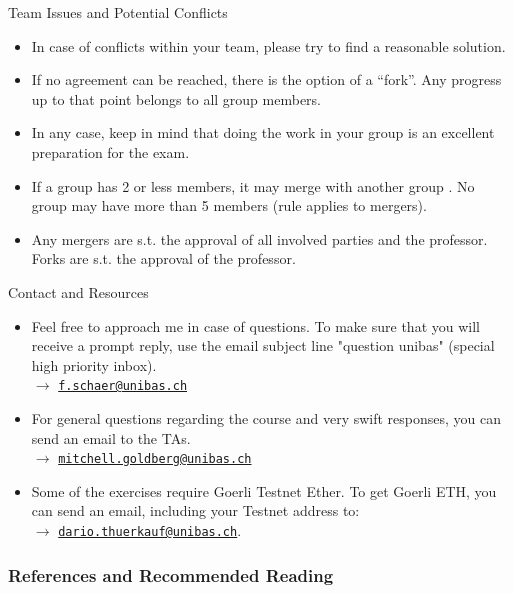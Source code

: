 \documentclass[handout]{beamer}
\begin{document}
\begin{frame}{Team Issues and Potential Conflicts}
\begin{itemize}
	\item<1-> In case of conflicts within your team, please try to find a \color{focus} reasonable solution\color{black}. 
	\item<2-> If no agreement can be reached, there is \color{focus} the option of a ``fork''\color{black}. Any progress up to that point belongs to all group members. 
	\item<3-> In any case, keep in mind that doing the work in your group is an \color{focus} excellent preparation for the exam\color{black}. 
	\item<4-> If a group \color{focus} has 2 or less members, it may merge with another group \color{black}. No group may have more than 5 members (rule applies to mergers). 
	\item<5-> Any mergers are \color{focus} s.t. the approval \color{black} of all involved parties and the professor. Forks are s.t. the approval of the professor.
\end{itemize}
\end{frame}


\begin{frame}{Contact and Resources}
\begin{itemize}
	\item<1-> Feel free to approach me in case of questions. To make sure that you will receive a prompt reply, use the email subject line "question unibas" (special high priority inbox). \\ $\rightarrow$ \href{mailto:f.schaer@unibas.ch?subject=question\%20unibas}{\texttt{f.schaer@unibas.ch}}
	\item<2-> For general questions regarding the course and very swift responses, you can send an email to the TAs. \\$\rightarrow$ \href{mailto:mitchell.goldberg@unibas.ch?subject=question\%20unibas}{\texttt{mitchell.goldberg@unibas.ch}}
	\item<3-> Some of the exercises require Goerli Testnet Ether. To get Goerli ETH, you can send an email, including your Testnet address to: \\
	$\rightarrow$ \href{mailto:dario.thuerkauf@unibas.ch?subject=Goerli\%20ETH}{\texttt{dario.thuerkauf@unibas.ch}}.
\end{itemize}
\end{frame}


\begin{frame}%
\frametitle{References and Recommended Reading}
	
	
\end{frame}
\end{document}
